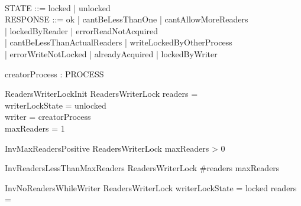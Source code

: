 \documentclass{article}
\begin{document}
\begin{zed}
[PROCESS] \\
\also
STATE ::= locked | unlocked\\
\also
RESPONSE ::= ok | cantBeLessThanOne | cantAllowMoreReaders \\
| lockedByReader | errorReadNotAcquired \\
| cantBeLessThanActualReaders | writeLockedByOtherProcess \\ 
| errorWriteNotLocked | alreadyAcquired | lockedByWriter
\end{zed}

\begin{axdef}
creatorProcess : PROCESS
\end{axdef}


\begin{schema}{ReadersWriterLockInit}
    ReadersWriterLock
\where
    readers = \emptyset \\
    writerLockState = unlocked \\
    writer = creatorProcess \\
    maxReaders = 1
\end{schema}

\begin{schema}{InvMaxReadersPositive}
    ReadersWriterLock
\where
    maxReaders > 0
\end{schema}

\begin{schema}{InvReadersLessThanMaxReaders}
    ReadersWriterLock
\where
    \#readers \leq maxReaders
\end{schema}

\begin{schema}{InvNoReadersWhileWriter}
    ReadersWriterLock
\where
    writerLockState = locked \implies readers = \emptyset
\end{schema}

\end{document}
